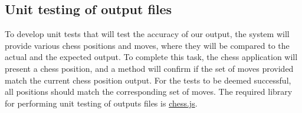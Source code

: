 \documentclass[12pt, titlepage]{article}
\begin{document}
\subsection{Unit testing of output files}		

	To develop unit tests that will test the accuracy of our output, the system will provide various chess positions and moves, where they will be compared to the actual and the expected output. To complete this task, the chess application will present a chess position, and a method will confirm if the set of moves provided match the current chess position output. For the tests to be deemed successful, all positions should match the corresponding set of moves. The required library for performing unit testing of outputs files is \href{https://www.npmjs.com/package/chess.js}{chess.js}.





\newpage






\end{document}
